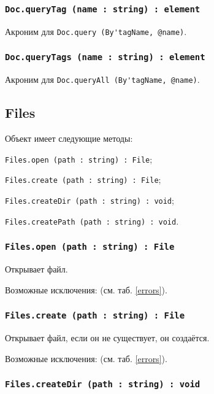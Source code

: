 \subsubsection{\lstinline|Doc.queryTag (name : string) : element|}

Акроним для \lstinline|Doc.query (By'tagName, @name)|.

\subsubsection{\lstinline|Doc.queryTags (name : string) : element|}

Акроним для \lstinline|Doc.queryAll (By'tagName, @name)|.

\subsection{{\color{orange} Files}}

Объект \files{} имеет следующие методы:
\begin{icItems}
	\item \lstinline|Files.open (path : string) : File|;
	\item \lstinline|Files.create (path : string) : File|;
	\item \lstinline|Files.createDir (path : string) : void|;
	\item \lstinline|Files.createPath (path : string) : void|.
\end{icItems}

\subsubsection{\lstinline|Files.open (path : string) : File|}

Открывает файл.

Возможные исключения:  (см. таб. \ref{errors}).

\subsubsection{\lstinline|Files.create (path : string) : File|}

Открывает файл, если он не существует, он создаётся.

Возможные исключения:  (см. таб. \ref{errors}).

\subsubsection{\lstinline|Files.createDir (path : string) : void|}

